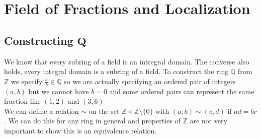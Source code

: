 \documentclass[16pt,a4paper]{article}
\theoremstyle{definition}
\newcommand{\Z}{\mathbb{Z}}
\begin{document}
\newpage
\section{Field of Fractions and Localization}
\subsection{Constructing $\mathbf{Q}$}
We know that every subring of a field is an intregral domain. The converse also holds, every integral domain is a subring of a field.  To construct the ring $\mathbb{Q}$ from $\Z$  we specify $\frac a b \in \mathbb{Q}$ so we are actually specifying an ordered pair of integers $(a,b)$ but we cannot have $b=0$ and some ordered pairs can represent the same fraction like $(1,2)$ and $(3,6)$
\\
We can define a relation $\sim$ on the set $\Z \times \Z\setminus \{0\}$ with $(a,b)\sim (c,d)$ if $ad = bc$. We can do this for any ring in general and properties of $\Z$ are not very important to show this is an equivalence relation. 
\end{document}
